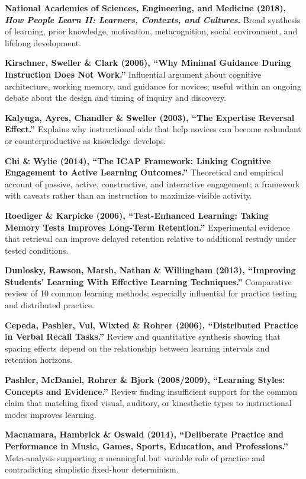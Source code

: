 \begin{enumerate}[label={[\textbf{R\arabic*}]}]
    \item \textbf{National Academies of Sciences, Engineering, and Medicine (2018), \emph{How People Learn II: Learners, Contexts, and Cultures}.} Broad synthesis of learning, prior knowledge, motivation, metacognition, social environment, and lifelong development.
    \item \textbf{Kirschner, Sweller \& Clark (2006), ``Why Minimal Guidance During Instruction Does Not Work.''} Influential argument about cognitive architecture, working memory, and guidance for novices; useful within an ongoing debate about the design and timing of inquiry and discovery.
    \item \textbf{Kalyuga, Ayres, Chandler \& Sweller (2003), ``The Expertise Reversal Effect.''} Explains why instructional aids that help novices can become redundant or counterproductive as knowledge develops.
    \item \textbf{Chi \& Wylie (2014), ``The ICAP Framework: Linking Cognitive Engagement to Active Learning Outcomes.''} Theoretical and empirical account of passive, active, constructive, and interactive engagement; a framework with caveats rather than an instruction to maximize visible activity.
    \item \textbf{Roediger \& Karpicke (2006), ``Test-Enhanced Learning: Taking Memory Tests Improves Long-Term Retention.''} Experimental evidence that retrieval can improve delayed retention relative to additional restudy under tested conditions.
    \item \textbf{Dunlosky, Rawson, Marsh, Nathan \& Willingham (2013), ``Improving Students' Learning With Effective Learning Techniques.''} Comparative review of 10 common learning methods; especially influential for practice testing and distributed practice.
    \item \textbf{Cepeda, Pashler, Vul, Wixted \& Rohrer (2006), ``Distributed Practice in Verbal Recall Tasks.''} Review and quantitative synthesis showing that spacing effects depend on the relationship between learning intervals and retention horizons.
    \item \textbf{Pashler, McDaniel, Rohrer \& Bjork (2008/2009), ``Learning Styles: Concepts and Evidence.''} Review finding insufficient support for the common claim that matching fixed visual, auditory, or kinesthetic types to instructional modes improves learning.
    \item \textbf{Macnamara, Hambrick \& Oswald (2014), ``Deliberate Practice and Performance in Music, Games, Sports, Education, and Professions.''} Meta-analysis supporting a meaningful but variable role of practice and contradicting simplistic fixed-hour determinism.

\end{enumerate}
